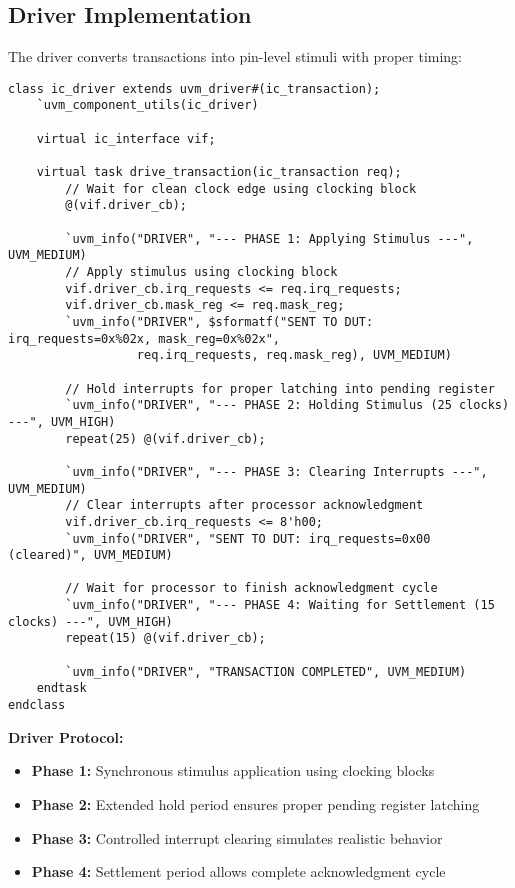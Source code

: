\documentclass[12pt,a4paper]{article}
\begin{document}
\subsection{Driver Implementation}
The driver converts transactions into pin-level stimuli with proper timing:

\begin{lstlisting}[caption=UVM Driver Implementation, label=lst:driver]
class ic_driver extends uvm_driver#(ic_transaction);
    `uvm_component_utils(ic_driver)
    
    virtual ic_interface vif;
    
    virtual task drive_transaction(ic_transaction req);
        // Wait for clean clock edge using clocking block
        @(vif.driver_cb);
        
        `uvm_info("DRIVER", "--- PHASE 1: Applying Stimulus ---", UVM_MEDIUM)
        // Apply stimulus using clocking block
        vif.driver_cb.irq_requests <= req.irq_requests;
        vif.driver_cb.mask_reg <= req.mask_reg;
        `uvm_info("DRIVER", $sformatf("SENT TO DUT: irq_requests=0x%02x, mask_reg=0x%02x", 
                  req.irq_requests, req.mask_reg), UVM_MEDIUM)
        
        // Hold interrupts for proper latching into pending register
        `uvm_info("DRIVER", "--- PHASE 2: Holding Stimulus (25 clocks) ---", UVM_HIGH)
        repeat(25) @(vif.driver_cb);
        
        `uvm_info("DRIVER", "--- PHASE 3: Clearing Interrupts ---", UVM_MEDIUM)
        // Clear interrupts after processor acknowledgment
        vif.driver_cb.irq_requests <= 8'h00;
        `uvm_info("DRIVER", "SENT TO DUT: irq_requests=0x00 (cleared)", UVM_MEDIUM)
        
        // Wait for processor to finish acknowledgment cycle
        `uvm_info("DRIVER", "--- PHASE 4: Waiting for Settlement (15 clocks) ---", UVM_HIGH)
        repeat(15) @(vif.driver_cb);
        
        `uvm_info("DRIVER", "TRANSACTION COMPLETED", UVM_MEDIUM)
    endtask
endclass
\end{lstlisting}

\textbf{Driver Protocol:}
\begin{itemize}
    \item \textbf{Phase 1:} Synchronous stimulus application using clocking blocks
    \item \textbf{Phase 2:} Extended hold period ensures proper pending register latching
    \item \textbf{Phase 3:} Controlled interrupt clearing simulates realistic behavior
    \item \textbf{Phase 4:} Settlement period allows complete acknowledgment cycle
\end{itemize}
\end{document}
